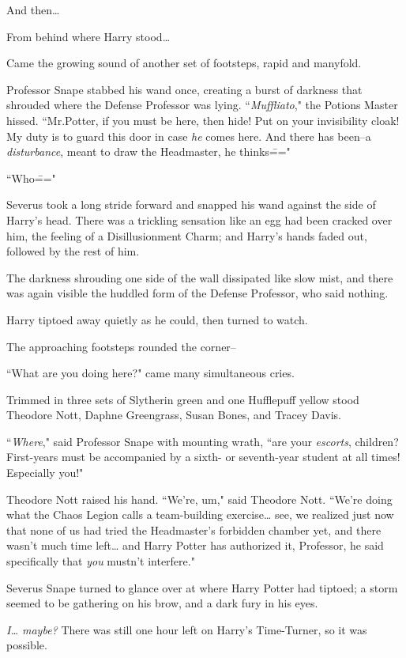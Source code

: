 And then{\ldots}

From behind where Harry stood{\ldots}

Came the growing sound of another set of footsteps, rapid and manyfold.

Professor Snape stabbed his wand once, creating a burst of darkness that shrouded where the Defense Professor was lying. ``\emph{Muffliato}," the Potions Master hissed. ``Mr.\?Potter, if you must be here, then hide! Put on your invisibility cloak! My duty is to guard this door in case \emph{he} comes here. And there has been\---a \emph{disturbance}, meant to draw the Headmaster, he thinks\==="

``Who\==="

Severus took a long stride forward and snapped his wand against the side of Harry's head. There was a trickling sensation like an egg had been cracked over him, the feeling of a Disillusionment Charm; and Harry's hands faded out, followed by the rest of him.

The darkness shrouding one side of the wall dissipated like slow mist, and there was again visible the huddled form of the Defense Professor, who said nothing.

Harry tiptoed away quietly as he could, then turned to watch.

The approaching footsteps rounded the corner\---

``What are you doing here?" came many simultaneous cries.

Trimmed in three sets of Slytherin green and one Hufflepuff yellow stood Theodore Nott, Daphne Greengrass, Susan Bones, and Tracey Davis.

``\emph{Where}," said Professor Snape with mounting wrath, ``are your \emph{escorts}, children? First-years must be accompanied by a sixth- or seventh-year student at all times! Especially you!"

Theodore Nott raised his hand. ``We're, um," said Theodore Nott. ``We're doing what the Chaos Legion calls a team-building exercise{\ldots} see, we realized just now that none of us had tried the Headmaster's forbidden chamber yet, and there wasn't much time left{\ldots} and Harry Potter has authorized it, Professor, he said specifically that \emph{you} mustn't interfere."

Severus Snape turned to glance over at where Harry Potter had tiptoed; a storm seemed to be gathering on his brow, and a dark fury in his eyes.

\emph{I{\ldots} maybe?} There was still one hour left on Harry's Time-Turner, so it was possible.

